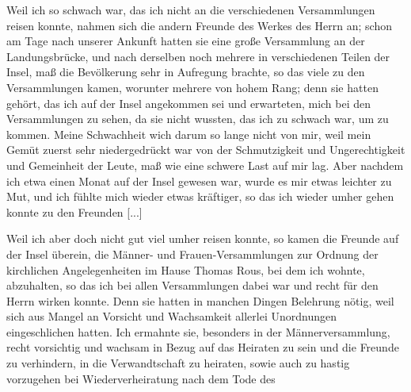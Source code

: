 Weil ich so schwach war, das ich nicht an die verschiedenen
Versammlungen reisen konnte, nahmen sich die andern Freunde
des Werkes des Herrn an; schon am Tage nach unserer Ankunft
hatten sie eine große Versammlung an der Landungsbrücke, und
nach derselben noch mehrere in verschiedenen Teilen der Insel,
maß die Bevölkerung sehr in Aufregung brachte, so das viele zu
den Versammlungen kamen, worunter mehrere von hohem Rang;
denn sie hatten gehört, das ich auf der Insel angekommen sei
und erwarteten, mich bei den Versammlungen zu sehen, da sie
nicht wussten, das ich zu schwach war, um zu kommen. Meine
Schwachheit wich darum so lange nicht von mir, weil mein 
Gemüt zuerst sehr niedergedrückt 
war von der Schmutzigkeit und
Ungerechtigkeit und Gemeinheit der Leute, maß wie eine schwere
Last auf mir lag. Aber nachdem ich etwa einen Monat auf der
Insel gewesen war, wurde es mir etwas leichter zu Mut, und
ich fühlte mich wieder etwas kräftiger, so das ich wieder umher
gehen konnte zu den Freunden [...]

Weil ich aber doch nicht gut viel umher reisen konnte, so
kamen die Freunde auf der Insel überein, die Männer- und
Frauen-Versammlungen zur Ordnung der kirchlichen Angelegenheiten 
im Hause Thomas Rous, bei dem ich wohnte, abzuhalten,
so das ich bei allen Versammlungen dabei war und recht für den
Herrn wirken konnte. Denn sie hatten in manchen Dingen Belehrung
nötig, weil sich aus Mangel an Vorsicht und Wachsamkeit 
allerlei Unordnungen eingeschlichen hatten. Ich ermahnte sie,
besonders in der Männerversammlung, recht vorsichtig und 
wachsam in Bezug auf das Heiraten zu sein und die Freunde zu
verhindern, in die Verwandtschaft zu heiraten, sowie auch zu
hastig vorzugehen bei Wiederverheiratung nach dem Tode des

